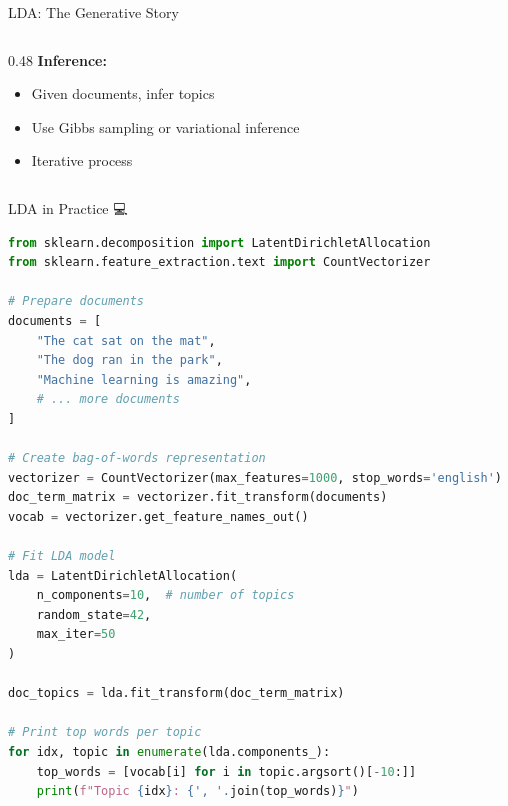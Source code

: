 \documentclass[aspectratio=169]{beamer}
\begin{document}
\begin{frame}[shrink=10]{LDA: The Generative Story 📖}
\begin{columns}[T]
\begin{column}{0.48\textwidth}
\vspace{1em}
\textbf{Inference:}
\begin{itemize}\setlength{\itemsep}{0pt}
    \item Given documents, infer topics
    \item Use Gibbs sampling or variational inference
    \item Iterative process
\end{itemize}
\end{column}
\end{columns}
\end{frame}

\begin{frame}[fragile]{LDA in Practice 💻}
\begin{lstlisting}[language=Python]
from sklearn.decomposition import LatentDirichletAllocation
from sklearn.feature_extraction.text import CountVectorizer

# Prepare documents
documents = [
    "The cat sat on the mat",
    "The dog ran in the park",
    "Machine learning is amazing",
    # ... more documents
]

# Create bag-of-words representation
vectorizer = CountVectorizer(max_features=1000, stop_words='english')
doc_term_matrix = vectorizer.fit_transform(documents)
vocab = vectorizer.get_feature_names_out()

# Fit LDA model
lda = LatentDirichletAllocation(
    n_components=10,  # number of topics
    random_state=42,
    max_iter=50
)

doc_topics = lda.fit_transform(doc_term_matrix)

# Print top words per topic
for idx, topic in enumerate(lda.components_):
    top_words = [vocab[i] for i in topic.argsort()[-10:]]
    print(f"Topic {idx}: {', '.join(top_words)}")
\end{lstlisting}
\end{frame}
\end{document}
